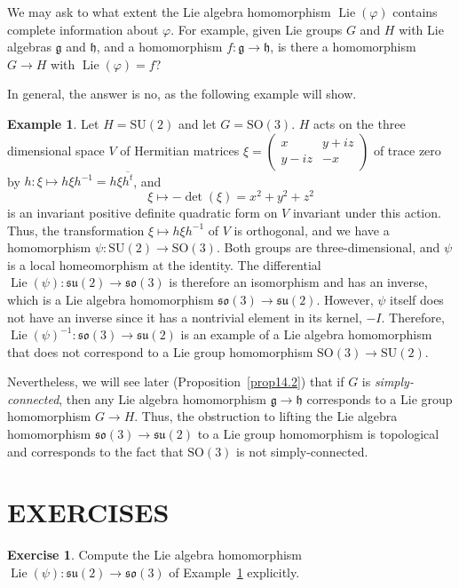 \documentclass[12pt,reqno]{book}%
\theoremstyle{definition}
\newtheorem{example}{Example}[chapter]
\newtheorem{exercise}{Exercise}[chapter]
\theoremstyle{remark}
\theoremstyle{theorem}
\theoremstyle{remark}
\DeclareMathOperator{\Lie}{Lie}
\begin{document}
We may ask to what extent the Lie algebra homomorphism $\Lie(\varphi)$ contains complete information about $\varphi$.
For example, given Lie groups $G$ and $H$ with Lie algebras $\mathfrak{g}$ and $\mathfrak{h}$, and a homomorphism $f : \mathfrak{g} \to \mathfrak{h}$, is there a homomorphism $G \to H$ with $\Lie(\varphi) = f$?

In general, the answer is no, as the following example will show.

\begin{example}\label{ex7.1}
    Let $H = \mathrm{SU}(2)$ and let $G = \mathrm{SO}(3)$.
    $H$ acts on the three dimensional space $V$ of Hermitian matrices $\xi = \begin{pmatrix}
        x & y + iz  \\
        y - iz & -x
    \end{pmatrix}$ of trace zero by $h : \xi \mapsto h\xi h^{-1} = h\xi \overline{h^t}$, and
    \[
        \xi \mapsto -\det(\xi) = x^2 + y^2 + z^2
    \]
    is an invariant positive definite quadratic form on $V$ invariant under this action.
    Thus, the transformation $\xi \mapsto h\xi h^{-1}$ of $V$ is orthogonal, and we have a homomorphism $\psi : \mathrm{SU}(2) \to \mathrm{SO}(3)$.
    Both groups are three-dimensional, and $\psi$ is a local homeomorphism at the identity.
    The differential $\Lie(\psi) : \mathfrak{su}(2) \to \mathfrak{so}(3)$ is therefore an isomorphism and has an inverse, which is a Lie algebra homomorphism $\mathfrak{so}(3) \to \mathfrak{su}(2)$.
    However, $\psi$ itself does not have an inverse since it has a nontrivial element in its kernel, $-I$.
    Therefore, $\Lie(\psi)^{-1} : \mathfrak{so}(3) \to \mathfrak{su}(2)$ is an example of a Lie algebra homomorphism that does not correspond to a Lie group homomorphism $\mathrm{SO}(3) \to \mathrm{SU}(2)$.
\end{example}

Nevertheless, we will see later (Proposition~\ref{prop14.2}) that if $G$ is \emph{simply-connected}, then any Lie algebra homomorphism $\mathfrak{g} \to \mathfrak{h}$ corresponds to a Lie group homomorphism $G \to H$.
Thus, the obstruction to lifting the Lie algebra homomorphism $\mathfrak{so}(3) \to \mathfrak{su}(2)$ to a Lie group homomorphism is topological and corresponds to the fact that $\mathrm{SO}(3)$ is not simply-connected.

\section*{EXERCISES}%
\begin{exercise}\label{}
    Compute the Lie algebra homomorphism $\Lie(\psi) : \mathfrak{su}(2) \to \mathfrak{so}(3)$ of Example~\ref{ex7.1} explicitly.
\end{exercise}
\end{document}
